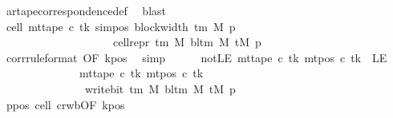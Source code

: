 \begin{isabellebody}
\ ar{\isacharunderscore}{\kern0pt}tape{\isacharunderscore}{\kern0pt}correspondence{\isacharunderscore}{\kern0pt}def\ \isamarkupfalse%
\ blast\isanewline
\ \ \ \ \isamarkupfalse%
\ cell{}{\isacharcolon}{\kern0pt}\ {\isachardoublequoteopen}mt{\isacharunderscore}{\kern0pt}tape\ c{\isacharprime}{\kern0pt}\ tk\ {\isacharparenleft}{\kern0pt}sim{\isacharunderscore}{\kern0pt}pos\ {\isacharparenleft}{\kern0pt}block{\isacharunderscore}{\kern0pt}width\ {\isacharparenleft}{\kern0pt}{\isasymGamma}{\isacharunderscore}{\kern0pt}tm\ M{\isacharparenright}{\kern0pt}{\isacharparenright}{\kern0pt}\ p{\isacharparenright}{\kern0pt}\isanewline
\ \ \ \ \ \ \ \ \ \ \ \ \ \ \ \ \ \ \ {\isacharequal}{\kern0pt}\ cell{\isacharunderscore}{\kern0pt}repr\ {\isacharparenleft}{\kern0pt}{\isasymGamma}{\isacharunderscore}{\kern0pt}tm\ M{\isacharparenright}{\kern0pt}\ {\isacharparenleft}{\kern0pt}bl{\isacharunderscore}{\kern0pt}tm\ M{\isacharparenright}{\kern0pt}\ {\isacharparenleft}{\kern0pt}tM\ p{\isacharparenright}{\kern0pt}\ {\isacharbang}{\kern0pt}\ {}{\isachardoublequoteclose}\isanewline
\ \ \ \ \ \ \isamarkupfalse%
\ corr{\isacharbrackleft}{\kern0pt}rule{\isacharunderscore}{\kern0pt}format{\isacharcomma}{\kern0pt}\ OF\ kpos{\isacharbrackright}{\kern0pt}\ \isamarkupfalse%
\ simp\isanewline
\ \ \ \ \isamarkupfalse%
\ notLE{\isacharcolon}{\kern0pt}\ {\isachardoublequoteopen}mt{\isacharunderscore}{\kern0pt}tape\ c{\isacharprime}{\kern0pt}\ tk\ {\isacharparenleft}{\kern0pt}mt{\isacharunderscore}{\kern0pt}pos\ c{\isacharprime}{\kern0pt}\ tk{\isacharparenright}{\kern0pt}\ {\isasymnoteq}\ LE{}{\isachardoublequoteclose}\isanewline
\ \ \ \ \isamarkupfalse%
\ {\isacharminus}{\kern0pt}\isanewline
\ \ \ \ \ \ \isamarkupfalse%
\ {\isachardoublequoteopen}mt{\isacharunderscore}{\kern0pt}tape\ c{\isacharprime}{\kern0pt}\ tk\ {\isacharparenleft}{\kern0pt}mt{\isacharunderscore}{\kern0pt}pos\ c{\isacharprime}{\kern0pt}\ tk{\isacharparenright}{\kern0pt}\isanewline
\ \ \ \ \ \ \ \ \ \ \ \ \ \ {\isacharequal}{\kern0pt}\ write{\isacharunderscore}{\kern0pt}bit\ {\isacharparenleft}{\kern0pt}{\isasymGamma}{\isacharunderscore}{\kern0pt}tm\ M{\isacharparenright}{\kern0pt}\ {\isacharparenleft}{\kern0pt}bl{\isacharunderscore}{\kern0pt}tm\ M{\isacharparenright}{\kern0pt}\ {\isacharparenleft}{\kern0pt}tM\ p{\isacharparenright}{\kern0pt}\ {}{\isachardoublequoteclose}\isanewline
\ \ \ \ \ \ \ \ \isamarkupfalse%
\ ppos\ cell{}\ cr{\isacharunderscore}{\kern0pt}wb{\isacharbrackleft}{\kern0pt}OF\ kpos{\isacharbrackright}{\kern0pt}\ \isamarkupfalse%

\end{isabellebody}
